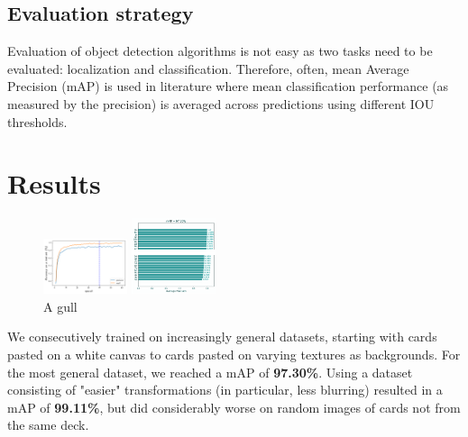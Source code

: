 \documentclass[a0,landscape]{a0poster}
\begin{document}
\begin{multicols}{3}
\subsection*{Evaluation strategy}
Evaluation of object detection algorithms is not easy as two tasks need to be evaluated: localization and classification.
Therefore, often, mean Average Precision (mAP) is used in literature where mean classification performance (as measured by the precision) is averaged across predictions using different IOU thresholds.




\section*{Results}
\begin{figure}

    \includegraphics[width=0.22\textwidth]{traindev}



    \includegraphics[width=0.22\textwidth]{mAP}

  \caption{A gull}
\end{figure}

We consecutively trained on increasingly general datasets, starting with cards pasted on a white canvas to cards pasted on varying textures as backgrounds.
For the most general dataset, we reached a mAP of \textbf{97.30\%}. Using a dataset consisting of "easier" transformations (in particular, less blurring) resulted in a mAP of \textbf{99.11\%}, but did considerably worse on random images of cards not from the same deck.







\end{multicols}
\end{document}

